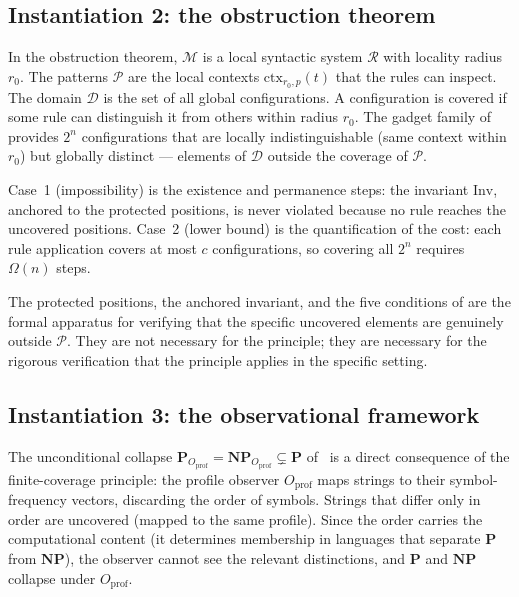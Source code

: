 \documentclass[11pt]{article}
\begin{document}
\subsection{Instantiation 2: the obstruction
theorem~\cite{buono2026obstruction}}

In the obstruction theorem, $\mathcal{M}$ is a local syntactic system
$\mathcal{R}$ with locality radius $r_0$. The patterns $\mathcal{P}$
are the local contexts $\mathrm{ctx}_{r_0,p}(t)$ that the rules can
inspect. The domain $\mathcal{D}$ is the set of all global
configurations. A configuration is covered if some rule can distinguish
it from others within radius $r_0$. The gadget family of
\cite[Lemma~4.2]{buono2026obstruction} provides $2^n$ configurations
that are locally indistinguishable (same context within $r_0$) but
globally distinct --- elements of $\mathcal{D}$ outside the coverage of
$\mathcal{P}$.

Case~1 (impossibility) is the existence and permanence steps: the
invariant $\mathrm{Inv}$, anchored to the protected positions, is never
violated because no rule reaches the uncovered positions. Case~2 (lower
bound) is the quantification of the cost: each rule application covers
at most $c$ configurations, so covering all $2^n$ requires $\Omega(n)$
steps.

The protected positions, the anchored invariant, and the five conditions
of \cite[Definition~3.8]{buono2026obstruction} are the formal apparatus
for verifying that the specific uncovered elements are genuinely outside
$\mathcal{P}$. They are not necessary for the principle; they are
necessary for the rigorous verification that the principle applies in the
specific setting.

\subsection{Instantiation 3: the observational
framework~\cite{buono2026framework,buono2026observer}}

The unconditional collapse $\mathbf{P}_{O_{\mathrm{prof}}} =
\mathbf{NP}_{O_{\mathrm{prof}}} \subsetneq \mathbf{P}$
of~\cite{buono2026framework} is a direct consequence of the finite-coverage
principle: the profile observer $O_{\mathrm{prof}}$ maps strings to
their symbol-frequency vectors, discarding the order of symbols.
Strings that differ only in order are uncovered (mapped to the same
profile). Since the order carries the computational content (it
determines membership in languages that separate $\mathbf{P}$ from
$\mathbf{NP}$), the observer cannot see the relevant distinctions, and
$\mathbf{P}$ and $\mathbf{NP}$ collapse under $O_{\mathrm{prof}}$.
\end{document}
